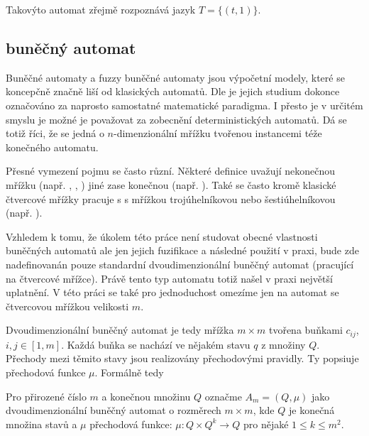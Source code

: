 \documentclass[a4paper,10pt]{article}
\begin{document}
Takovýto automat zřejmě rozpoznává jazyk $T = \{ (t, 1) \}$. 


\subsection{ buněčný automat}
Buněčné automaty a fuzzy buněčné automaty jsou výpočetní modely, které se koncepčně značně liší od klasických automatů. Dle \cite{Wol-NewKinSci} je jejich studium dokonce označováno za naprosto samostatné matematické paradigma. I přesto je v určitém smyslu je možné je považovat za zobecnění  deterministických automatů. Dá se totiž říci, že se jedná o $n$-dimenzionální mřížku tvořenou instancemi téže konečného automatu.

Přesné vymezení pojmu  se často různí. Některé definice uvažují nekonečnou mřížku (např. \cite{Wol-NewKiSci}, \cite{Wol-CelAut}, \cite{BatXie-CellCity})
jiné zase konečnou (např. \cite{Wu-ExpGenPolUrbGroCelAutCit}). Také se často kromě klasické čtvercové mřížky pracuje s s mřížkou trojúhelníkovou nebo šestiúhelníkovou (např. \cite{For-FuzCelAutConjNormForm}).

Vzhledem k tomu, že úkolem této práce není studovat obecné vlastnosti buněčných automatů ale jen jejich fuzifikace a následné použití v praxi, bude zde nadefinovanán pouze standardní dvoudimenzionální buněčný automat (pracující na čtvercové mřížce). Právě tento typ automatu totiž našel v praxi největší uplatnění. V této práci se také pro jednoduchost omezíme jen na automat se čtvercovou mřížkou velikosti $m$.

Dvoudimenzionální buněčný automat je tedy mřížka $m \times m$ tvořena buňkami $c_{ij}$, $i, j \in [1,m]$. Každá buňka se nachází ve nějakém stavu $q$ z množiny $Q$. Přechody mezi těmito stavy jsou realizovány přechodovými pravidly. Ty popsiuje přechodová funkce $\mu$. Formálně tedy

\begin{definition}
  Pro přirozené číslo $m$ a konečnou množinu $Q$ označme $A_{m} = (Q, \mu)$ jako dvoudimenzionální buněčný automat o rozměrech $m \times m$, kde $Q$ je konečná množina stavů a $\mu$ přechodová funkce: $\mu: Q \times Q^k \rightarrow Q$ pro nějaké $1 \leq k \leq m^2$.
\end{definition}
\end{document}
